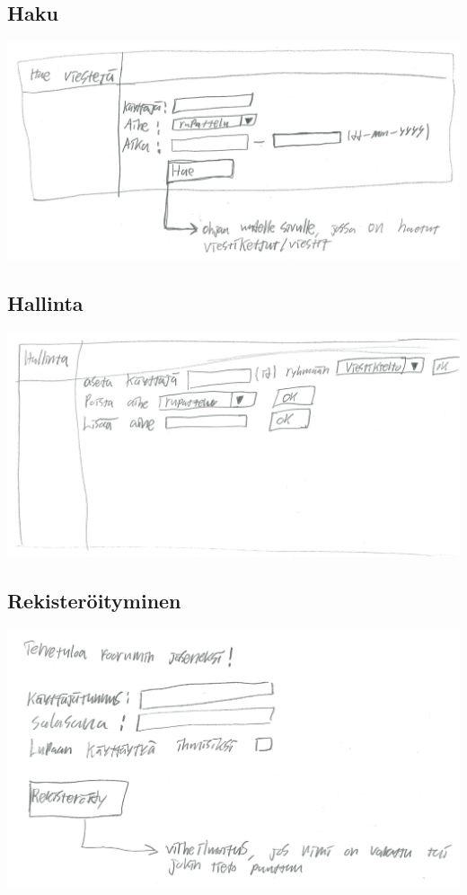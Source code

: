 \documentclass[a4paper, 12pt, finnish]{article}
\begin{document}
\subsection{Haku}
\includegraphics[width=\textwidth,height=\textheight,keepaspectratio]{haku.png}

\subsection{Hallinta}
\includegraphics[width=\textwidth,height=\textheight,keepaspectratio]{hallinta.png}

\subsection{Rekisteröityminen}
\includegraphics[width=\textwidth,height=\textheight,keepaspectratio]{rekisteroityminen.png}
\end{document}
